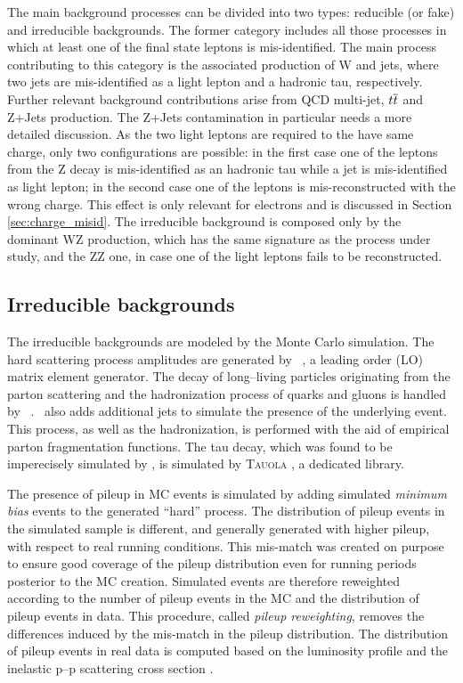 The main background processes can be divided into two types: reducible (or fake) and irreducible backgrounds. The former category includes all those processes in which at least one of the final state leptons is mis-identified. The main process contributing to this category is the associated production of W and jets, where two jets are mis-identified as a light lepton and a hadronic tau, respectively. Further relevant background contributions arise from QCD multi-jet, $t\overline{t}$ and Z+Jets production. The Z+Jets contamination in particular needs a more detailed discussion. As the two light leptons are required to the have same charge, only two configurations are possible: in the first case one of the leptons from the Z decay is mis-identified as an hadronic tau while a jet is mis-identified as light lepton; in the second case one of the leptons is mis-reconstructed with the wrong charge. This effect is only relevant for electrons and is discussed in Section \ref{sec:charge_misid}. The irreducible background is composed only by the dominant WZ production, which has the same signature as the process under study, and the ZZ one, in case one of the light leptons fails to be reconstructed.

\subsection{Irreducible backgrounds}

The irreducible backgrounds are modeled by the Monte Carlo simulation. The hard scattering process amplitudes are generated by \madgraph\ \cite{MG4}, a leading order (LO) matrix element generator. The decay of long--living particles originating from the parton scattering and the hadronization process of quarks and gluons is handled by \pythia\ \cite{pythia}. \pythia\ also adds additional jets to simulate the presence of the underlying event. This process, as well as the hadronization, is performed with the aid of empirical parton fragmentation functions. The tau decay, which was found to be imperecisely simulated by \pythia, is simulated by \textsc{Tauola} \cite{tauola}, a dedicated library. 

The presence of pileup in MC events is simulated by adding simulated \emph{minimum bias} events to the generated ``hard'' process. The distribution of pileup events in the simulated sample is different, and generally generated with higher pileup, with respect to real running conditions. 
This mis-match was created on purpose to ensure good coverage of the pileup distribution even for running periods posterior to the MC creation.
Simulated events are therefore reweighted according to the number of pileup events in the MC and the distribution of pileup events in data. This procedure, called \emph{pileup reweighting}, removes the differences induced by the mis-match in the pileup distribution. The distribution of pileup events in real data is computed based on the luminosity profile and the inelastic p--p scattering cross section \cite{Antchev:2013paa}.

